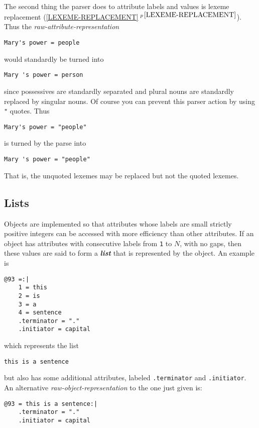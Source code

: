 \documentclass[12pt]{article}
\newcommand{\key}[1]{{\bf \em #1}\index{#1}}
\newcommand{\secref}[1]{\ref{#1}$\,^{p\,\pageref{#1}}$}
\newenvironment{indpar}[1][0.3in]%
	{\begin{list}{}%
		     {\setlength{\itemsep}{0in}%
		      \setlength{\topsep}{0in}%
		      \setlength{\parsep}{1ex}%
		      \setlength{\labelwidth}{#1}%
		      \setlength{\leftmargin}{#1}%
		      \addtolength{\leftmargin}{\labelsep}}%
	 \item}%
	{\end{list}}
\begin{document}
The second thing the parser does to attribute labels and values
is lexeme replacement (\secref{LEXEME-REPLACEMENT}).  Thus the
{\em raw-attribute-representation}
\begin{center}
\verb|Mary's power = people|
\end{center}
would standardly be turned into
\begin{center}
\verb|Mary 's power = person|
\end{center}
since possessives are standardly separated and
plural nouns are standardly replaced by singular nouns.
Of course you can prevent this parser action by using \verb|"| quotes.
Thus
\begin{center}
\verb|Mary's power = "people"|
\end{center}
is turned by the parse into
\begin{center}
\verb|Mary 's power = "people"|
\end{center}
That is, the unquoted lexemes may be replaced but not the quoted lexemes.

\subsection{Lists}

Objects are implemented so that attributes whose labels are small
strictly positive integers can be accessed with more efficiency
than other attributes.  If an object has attributes with consecutive
labels from \verb|1| to $N$, with no gaps,
then these values are said to form a \key{list} that is represented
by the object.  An example is

\begin{indpar}\begin{verbatim}
@93 =:|
    1 = this
    2 = is
    3 = a
    4 = sentence
    .terminator = "."
    .initiator = capital
\end{verbatim}\end{indpar}

which represents the list
\begin{indpar}
\verb|this is a sentence|
\end{indpar}

but also has some additional attributes, labeled \verb|.terminator|
and \verb|.initiator|.  An alternative {\em raw-object-representation}
to the one just given is:

\begin{indpar}\begin{verbatim}
@93 = this is a sentence:|
    .terminator = "."
    .initiator = capital
\end{verbatim}\end{indpar}
\end{document}
